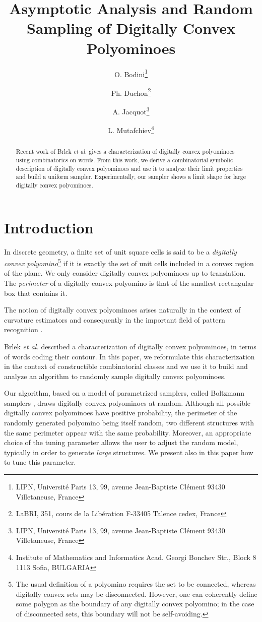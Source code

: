 \documentclass{article}
\title{Asymptotic Analysis and Random Sampling of Digitally Convex Polyominoes}
\author{O. Bodini\thanks{LIPN, Université Paris 13, 99, avenue Jean-Baptiste Clément 93430
Villetaneuse, France}
\and Ph. Duchon\thanks{LaBRI, 351, cours de la Libération F-33405 Talence cedex, France}
\and A. Jacquot\thanks{LIPN, Université Paris 13, 99, avenue Jean-Baptiste Clément 
93430 Villetaneuse, France}
\and L. Mutafchiev\thanks{Institute of Mathematics and Informatics Acad. Georgi Bonchev Str.,
Block 8 1113 Sofia, BULGARIA}
}
\begin{document}
\maketitle

\begin{abstract}
Recent work of Brlek \textit{et al.} gives a characterization of digitally
convex polyominoes using combinatorics on words. From this work,
we derive a combinatorial symbolic description of digitally convex polyominoes
and use it to analyze their limit properties and  build a uniform
sampler. Experimentally,
our sampler shows a limit shape for large digitally convex
polyominoes.
\end{abstract}

\section*{Introduction}



In discrete geometry, a finite set of unit square cells is said to be
a \emph{digitally convex polyomino}\footnote{The usual definition of a
  polyomino requires the set to be connected, whereas digitally convex
  sets may be disconnected. 
However, one can coherently define some
  polygon as the boundary of any digitally convex polyomino; in the case
  of disconnected sets, this boundary will not be self-avoiding.


} if
it is exactly the set of unit cells included in a convex region of the
plane. We only consider
digitally convex polyominoes up to translation.
The \emph{perimeter} of a digitally convex polyomino is that of
the smallest rectangular box that contains it.

The notion of digitally convex polyominoes arises naturally in the context of curvature estimators and consequently in the important field of pattern recognition \cite{KLN2008,CMT2001}.

Brlek \emph{et al.} \cite{Brlek09a} described a characterization of digitally convex polyominoes,
in terms of words coding their contour.
In this paper, we reformulate this characterization in the context of constructible combinatorial classes 
and we use it to build and analyze an algorithm to randomly sample digitally convex polyominoes.

Our algorithm, based on a model of parametrized samplers, called Boltzmann samplers \cite{DuFlLoSc04}, draws
digitally convex polyominoes at random. Although all
possible digitally convex polyominoes have positive probability,
the perimeter of the randomly generated polyomino being itself
random, two different structures with the same perimeter
appear with the same probability. Moreover, an appropriate choice of the
tuning parameter allows the user to adjust the random model,
typically in order to generate \emph{large} structures. 
We present also in this paper how to tune this parameter. 
\end{document}
